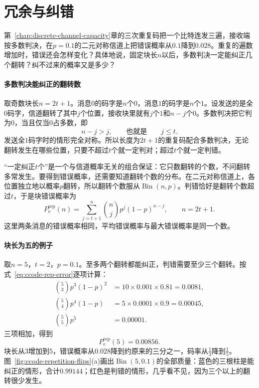 \section{冗余与纠错}
\label{sec:ccode-redundancy}

第~\ref{chap:discrete-channel-capacity}章的三次重复码把一个比特连发三遍，接收端按多数判决，在$p=0.1$的二元对称信道上把错误概率从$0.1$降到$0.028$。重复的遍数增加时，错误还会怎样变化？具体地说，固定块长$n$以后，多数判决一定能纠正几个翻转？纠不过来的概率又是多少？

\paragraph{多数判决能纠正的翻转数}
取奇数块长$n=2t+1$。消息$0$的码字是$n$个$0$，消息$1$的码字是$n$个$1$。设发送的是全$0$码字，信道翻转了其中$j$个位置，接收块里就有$j$个$1$和$n-j$个$0$。多数判决把它判为$0$，当且仅当$0$占多数，即
\[
 n-j>j,\qquad\text{也就是}\qquad j\leq t .
\]
发送全$1$码字时的情形完全对称。所以长度为$2t+1$的重复码配合多数判决，无论翻转发生在哪些位置，只要不超过$t$个就一定判对；超过$t$个就一定判错。

“一定纠正$t$个”是一个与信道概率无关的组合保证：它只数翻转的个数，不问翻转多常发生。要得到错误概率，还需要知道翻转个数的分布。在二元对称信道上，各位置独立地以概率$p$翻转，所以翻转个数服从$\operatorname{Bin}(n,p)$。判错恰好是翻转个数超过$t$，于是块错误概率为
\begin{equation}
 P_{\mathrm{e}}^{\mathrm{rep}}(n)=\sum_{j=t+1}^{n}\binom{n}{j}p^{j}(1-p)^{n-j},\qquad n=2t+1 .
 \label{eq:ccode-rep-error}
\end{equation}
这里两条消息的错误概率相同，平均错误概率与最大错误概率是同一个数。

\paragraph{块长为五的例子}
取$n=5$，$t=2$，$p=0.1$。至多两个翻转都能纠正，判错需要至少三个翻转。按式~\eqref{eq:ccode-rep-error}逐项计算：
\[
 \begin{aligned}
 \binom53p^3(1-p)^2&=10\times0.001\times0.81=0.0081 ,\\
 \binom54p^4(1-p)&=5\times0.0001\times0.9=0.00045 ,\\
 \binom55p^5&=0.00001 .
 \end{aligned}
\]
三项相加，得到
\[
 P_{\mathrm{e}}^{\mathrm{rep}}(5)=0.00856 .
\]
块长从$3$增加到$5$，错误概率从$0.028$降到约原来的三分之一，码率从$\tfrac13$降到$\tfrac15$。图~\ref{fig:ccode-repetition-flips}(a)画出$\operatorname{Bin}(5,0.1)$的全部质量：蓝色的三根柱是能纠正的情形，合计$0.99144$；红色是判错的情形，几乎看不见，因为三个以上的翻转很少发生。

